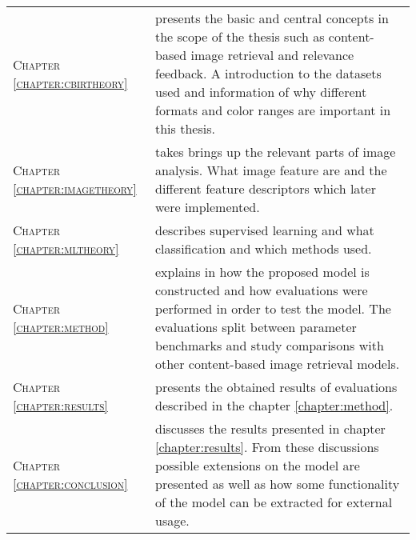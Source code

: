 \begin{tabular}{l p{}}
\textsc{Chapter \ref{chapter:cbirtheory}} & \textbf{\nameref{chapter:cbirtheory}} 
presents the basic and central concepts in the scope of the thesis such as content-based image retrieval and relevance feedback. A introduction to the datasets used and information of why different formats and color ranges are important in this thesis.\\ 
\textsc{Chapter \ref{chapter:imagetheory}} & \textbf{\nameref{chapter:imagetheory}}
takes brings up the relevant parts of image analysis. What image feature are and the different feature descriptors which later were implemented.\\ 
\textsc{Chapter \ref{chapter:mltheory}} & \textbf{\nameref{chapter:mltheory}}
describes supervised learning and what classification and which methods used. \\ 
\textsc{Chapter \ref{chapter:method}} & \textbf{\nameref{chapter:method}}
explains in how the proposed model is constructed and how evaluations were performed in order to test the model. The evaluations split between parameter benchmarks and study comparisons with other content-based image retrieval models.\\ 
\textsc{Chapter \ref{chapter:results}} & \textbf{\nameref{chapter:results}}
presents the obtained results of evaluations described in the chapter \ref{chapter:method}. \\ 
\textsc{Chapter \ref{chapter:conclusion}} & \textbf{\nameref{chapter:conclusion}}
discusses the results presented in chapter \ref{chapter:results}. From these discussions possible extensions on the model are presented as well as how some functionality of the model can be extracted for external usage. \\ 
\end{tabular}

